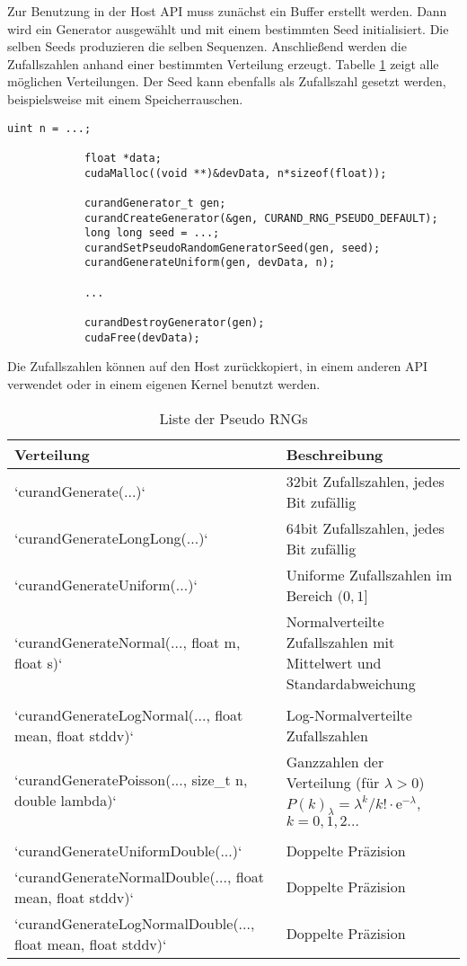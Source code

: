 			Zur Benutzung in der Host \Gls{API} muss zunächst ein Buffer erstellt werden. Dann wird ein Generator ausgewählt und mit einem bestimmten Seed initialisiert. Die selben Seeds produzieren die selben Sequenzen. Anschlie\ss end werden die Zufallszahlen anhand einer bestimmten Verteilung erzeugt. Tabelle \ref{tab5:dist} zeigt alle möglichen Verteilungen. Der Seed kann ebenfalls als Zufallszahl gesetzt werden, beispielsweise mit einem Speicherrauschen.
			\begin{lstlisting}[caption=cuRAND: Host API]
			uint n = ...;			
			
			float *data;
			cudaMalloc((void **)&devData, n*sizeof(float));
			
			curandGenerator_t gen;
			curandCreateGenerator(&gen, CURAND_RNG_PSEUDO_DEFAULT);
			long long seed = ...;
			curandSetPseudoRandomGeneratorSeed(gen, seed);
			curandGenerateUniform(gen, devData, n);
			
			...
			
			curandDestroyGenerator(gen);
			cudaFree(devData);
			\end{lstlisting}	
					
			Die Zufallszahlen können auf den Host zurückkopiert, in einem anderen \Gls{API} verwendet oder in einem eigenen \Gls{Kernel} benutzt werden.
			
			\begin{table}[h]
			\centering
			\begin{tabular}{|l|l|}
				\hline
				\textbf{Verteilung} & \textbf{Beschreibung} \\ \hline\hline
				\li`curandGenerate(...)` & 32bit Zufallszahlen, jedes Bit zufällig \\ \hline
				\li`curandGenerateLongLong(...)` & 64bit Zufallszahlen, jedes Bit zufällig \\ \hline
				\li`curandGenerateUniform(...)` & Uniforme Zufallszahlen im Bereich $(0,1]$ \\ \hline
				\li`curandGenerateNormal(..., float m, float s)` & \multirowcell{2}{Normalverteilte Zufallszahlen mit \\ Mittelwert und Standardabweichung} \\
				 & \\ \hline
				\li`curandGenerateLogNormal(..., float mean, float stddv)` & Log-Normalverteilte Zufallszahlen \\ \hline
				\li`curandGeneratePoisson(..., size_t n, double lambda)` & \multirowcell{2}{Ganzzahlen der Verteilung (für $\lambda > 0$) \\ $P(k)_{\lambda} = \lambda^k/k!\cdot\mathrm{e}^{-\lambda}$, $k=0,1,2...$} \\
				 & \\ \hline
				\li`curandGenerateUniformDouble(...)` & Doppelte Präzision \\ \hline
				\li`curandGenerateNormalDouble(..., float mean, float stddv)` & Doppelte Präzision \\ \hline
				\li`curandGenerateLogNormalDouble(..., float mean, float stddv)` & Doppelte Präzision \\ \hline\bottomrule
			\end{tabular}
			\caption{Liste der Pseudo RNGs}
			\label{tab5:dist}
			\end{table}
			
